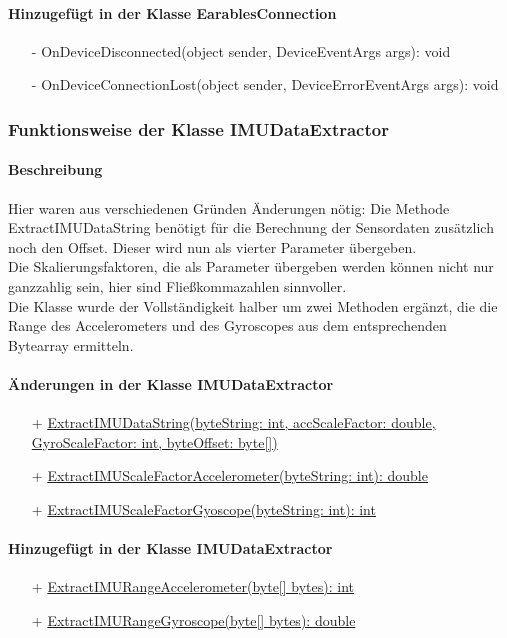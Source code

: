 \documentclass[a4paper,12pt]{article}
\begin{document}
\paragraph{Hinzugefügt in der Klasse EarablesConnection}

\begin{itemize}
	\item[-] OnDeviceDisconnected(object sender, DeviceEventArgs args): void 
	\item[-] OnDeviceConnectionLost(object sender, DeviceErrorEventArgs args): void
\end{itemize}

\subsubsection{Funktionsweise der Klasse IMUDataExtractor}
\paragraph{Beschreibung}
Hier waren aus verschiedenen Gründen Änderungen nötig: 
Die Methode ExtractIMUDataString benötigt für die Berechnung der Sensordaten zusätzlich noch den Offset. Dieser wird nun als vierter Parameter übergeben.\\
 Die Skalierungsfaktoren, die als Parameter übergeben werden können nicht nur ganzzahlig sein, hier sind Fließkommazahlen sinnvoller.\\
Die Klasse wurde der Vollständigkeit halber um zwei Methoden ergänzt, die die Range des Accelerometers und des Gyroscopes aus dem entsprechenden Bytearray ermitteln.
\paragraph{Änderungen in der Klasse IMUDataExtractor}
\begin{itemize}
  \item[+] \underline{ExtractIMUDataString(byteString: int, accScaleFactor: double,} \\
  \underline{GyroScaleFactor: int, byteOffset: byte[])} 
	\item[+] \underline{ExtractIMUScaleFactorAccelerometer(byteString: int): double}
	\item[+] \underline{ExtractIMUScaleFactorGyoscope(byteString: int): int}
\end{itemize}
\paragraph{Hinzugefügt in der Klasse IMUDataExtractor}
\begin{itemize}
  \item[+] \underline{ExtractIMURangeAccelerometer(byte[] bytes): int} 
	\item[+] \underline{ExtractIMURangeGyroscope(byte[] bytes): double} 
\end{itemize}
\end{document}
